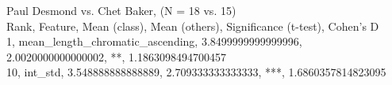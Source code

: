 Paul Desmond vs. Chet Baker, (N = 18 vs. 15)\\
Rank, Feature, Mean (class), Mean (others), Significance (t-test), Cohen's D\\
1, mean_length_chromatic_ascending, 3.8499999999999996, 2.0020000000000002, **, 1.1863098494700457\\
10, int_std, 3.548888888888889, 2.709333333333333, ***, 1.6860357814823095\\
